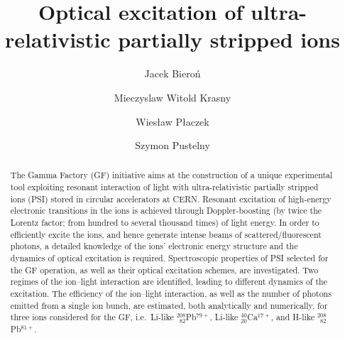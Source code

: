 \documentclass[superscriptaddress,
amsmath,amssymb%
pra,twocolumn,
floatfix
]{revtex4-2}
\begin{document}
\title{Optical excitation of ultra-relativistic partially stripped ions}

\author{Jacek Biero\'n}
\author{Mieczyslaw Witold Krasny}
\author{Wies{\l}aw P{\l}aczek}
\author{Szymon Pustelny}

\begin{abstract}

The Gamma Factory (GF) initiative aims at the construction of a unique experimental tool exploiting resonant interaction of light with ultra-relativistic partially stripped ions (PSI) stored in circular accelerators at CERN. Resonant excitation of high-energy electronic transitions in the ions is achieved through Doppler-boosting (by twice the Lorentz factor; from hundred to several thousand times) of light energy. In order to efficiently excite the ions, and hence generate intense beams of scattered/fluorescent photons, a detailed knowledge of the ions' electronic energy structure and the dynamics of optical excitation is required. Spectroscopic properties of PSI selected for the GF operation, as well as their optical excitation schemes, are investigated.  Two regimes of the ion--light interaction are identified, leading to different dynamics of the excitation.  The efficiency of the ion--light interaction, as well as the number of photons emitted from a single ion bunch, are estimated, both analytically and numerically, for three ions considered for the GF, i.e.~Li-like ${}^{208}_{\phantom{0}82}$Pb$^{79+}$, Li-like ${}^{40}_{20}$Ca$^{17+}$, and H-like ${}^{208}_{\phantom{0}82}$Pb$^{81+}$.

\end{abstract}


\maketitle
\end{document}
